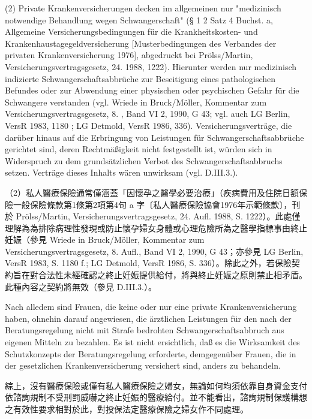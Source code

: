 \documentclass[12pt]{article}
\begin{document}
\begin{sourcepara}[title={原文E.208}]
(2) Private Krankenversicherungen decken im allgemeinen nur "medizinisch notwendige Behandlung wegen Schwangerschaft" (§ 1 \abbrAbs{} 2 Satz 4 Buchst. a, Allgemeine Versicherungsbedingungen für die Krankheitskosten- und Krankenhaustagegeldversicherung [Musterbedingungen des Verbandes der privaten Krankenversicherung 1976], abgedruckt bei Prölss/Martin, Versicherungsvertragsgesetz, 24. \abbrAufl{} 1988, \abbrS{} 1222). Hierunter werden nur medizinisch indizierte Schwangerschaftsabbrüche zur Beseitigung eines pathologischen Befundes oder zur Abwendung einer physischen oder psychischen Gefahr für die Schwangere verstanden (vgl. Wriede in Bruck/Möller, Kommentar zum Versicherungsvertragsgesetz, 8. \abbrAufl{}, Band VI 2, 1990, G 43; vgl. auch LG Berlin, VersR 1983, \abbrS{} 1180 \abbrF{}; LG Detmold, VersR 1986, \abbrS{} 336). Versicherungsverträge, die darüber hinaus auf die Erbringung von Leistungen für Schwangerschaftsabbrüche gerichtet sind, deren Rechtmäßigkeit nicht festgestellt ist, würden sich in Widerspruch zu dem grundsätzlichen Verbot des Schwangerschaftsabbruchs setzen. Verträge dieses Inhalts wären unwirksam (vgl. D.III.3.).
\end{sourcepara}
\begin{transpara}
（2）私人醫療保險通常僅涵蓋「因懷孕之醫學必要治療」（疾病費用及住院日額保險一般保險條款第1條第2項第4句 a 字〔私人醫療保險協會1976年示範條款〕，刊於 Prölss/Martin, Versicherungsvertragsgesetz, 24. Aufl. 1988, S. 1222）。此處僅理解為為排除病理性發現或防止懷孕婦女身體或心理危險所為之醫學指標事由終止妊娠（參見 Wriede in Bruck/Möller, Kommentar zum Versicherungsvertragsgesetz, 8. Aufl., Band VI 2, 1990, G 43；亦參見 LG Berlin, VersR 1983, S. 1180 f.; LG Detmold, VersR 1986, S. 336）。除此之外，若保險契約旨在對合法性未經確認之終止妊娠提供給付，將與終止妊娠之原則禁止相矛盾。此種內容之契約將無效（參見 D.III.3.）。
\end{transpara}

\begin{sourcepara}[title={原文E.209}]
Nach alledem sind Frauen, die keine oder nur eine private Krankenversicherung haben, ohnehin darauf angewiesen, die ärztlichen Leistungen für den nach der Beratungsregelung nicht mit Strafe bedrohten Schwangerschaftsabbruch aus eigenen Mitteln zu bezahlen. Es ist nicht ersichtlich, daß es die Wirksamkeit des Schutzkonzepts der Beratungsregelung erforderte, demgegenüber Frauen, die in der gesetzlichen Krankenversicherung versichert sind, anders zu behandeln.
\end{sourcepara}
\begin{transpara}
綜上，沒有醫療保險或僅有私人醫療保險之婦女，無論如何均須依靠自身資金支付依諮詢規制不受刑罰威嚇之終止妊娠的醫療給付。並不能看出，諮詢規制保護構想之有效性要求相對於此，對投保法定醫療保險之婦女作不同處理。
\end{transpara}
\end{document}
